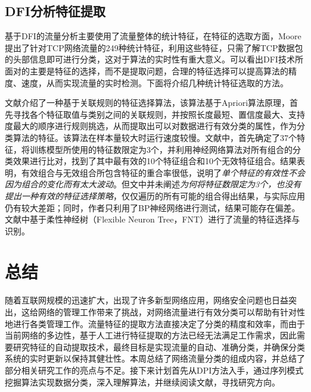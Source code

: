 \documentclass[a4papper]{article}
\begin{document}
\subsection{DFI分析特征提取}
\par\setlength{\parindent}{2em} %
基于DFI的流量分析主要使用了流量整体的统计特征，在特征的选取方面，Moore提出了针对TCP网络流量的249种统计特征，利用这些特征，只需了解TCP数据包的头部信息即可进行分类\cite{moore2013discriminators}，这对于算法的实时性有重大意义。可以看出DFI技术所面对的主要是特征的选择，而不是提取问题，合理的特征选择可以提高算法的精度、速度，从而实现流量的实时检测。下面将介绍几种统计特征选取的方法。
\par\setlength{\parindent}{2em} %
文献\cite{武建华2009基于关联规则的特征选择算法}介绍了一种基于关联规则的特征选择算法，该算法基于Apriori算法原理，首先寻找各个特征取值与类别之间的关联规则，并按照长度最短、置信度最大、支持度最大的顺序进行规则挑选，从而提取出可以对数据进行有效分类的属性，作为分类算法的特征。该算法在样本量较大时运行速度较慢。文献\cite{牟澄2014互联网流量特征智能提取关键技术研究}中，首先确定了37个特征，将训练模型所使用的特征数限定为3个，并利用神经网络算法对所有组合的分类效果进行比对，找到了其中最有效的10个特征组合和10个无效特征组合。结果表明，有效组合与无效组合所包含特征的重合率很低，说明了\emph{单个特征的有效性不会因为组合的变化而有太大波动}。但文中并未阐述\emph{为何将特征数限定为3个，也没有提出一种有效的特征选择策略}，仅仅遍历的所有可能的组合得出结果，与实际应用仍有较大差距；同时，作者只利用了BP神经网络进行测试，结果可能存在偏差。文献\cite{彭立志2015基于机器学习的流量识别关键技术研究}中基于柔性神经树（Flexible Neuron Tree，FNT）进行了流量的特征选择与识别。
\section{总结}
\par\setlength{\parindent}{2em} %
随着互联网规模的迅速扩大，出现了许多新型网络应用，网络安全问题也日益突出，这给网络的管理工作带来了挑战，对网络流量进行有效分类可以帮助有针对性地进行各类管理工作。流量特征的提取方法直接决定了分类的精度和效率，而由于当前网络的多边性，基于人工进行特征提取的方法已经无法满足工作需求，因此需要研究特征的自动提取技术，最终目标是实现流量的自动、准确分类，并确保分类系统的实时更新以保持其健壮性。本周总结了网络流量分类的组成内容，并总结了部分相关研究工作的亮点与不足。接下来计划首先从DPI方法入手，通过序列模式挖掘算法实现数据分类，深入理解算法，并继续阅读文献，寻找研究方向。


\end{document}
